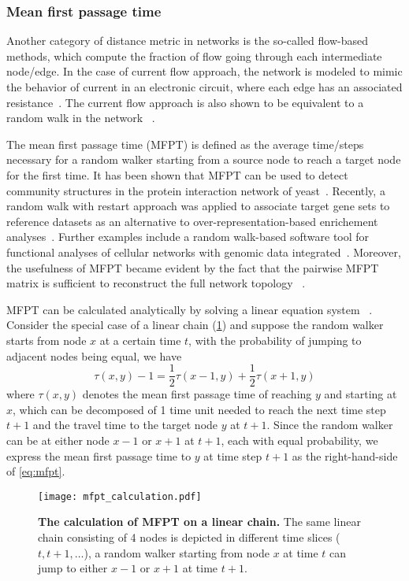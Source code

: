 \subsubsection{Mean first passage time}
Another category of distance metric in networks is the 
so-called flow-based methods, which compute the fraction of flow going through each intermediate node/edge. In the case of current flow approach, the network is modeled to mimic the behavior of current in an electronic circuit, where each edge has an associated resistance~\citep{Missiuro2009}. The current flow approach is
also shown to be equivalent to a random walk in the network~%
\citep{Doyle2000}.

The mean first passage time (MFPT) is defined as the average time/steps 
necessary for 
a random walker starting from a source node to reach a target node for the
first time. It has been shown that MFPT can be used to detect community
structures in the protein interaction network of yeast~\citep{Zhou2003}. 
Recently, a random walk with restart approach was applied to associate
target gene sets to reference datasets as an alternative to 
over-representation-based enrichement analyses~\citep{Glaab2012}. 
Further examples include a random walk-based software tool for functional
analyses of cellular networks with genomic data integrated~\citep{Komurov2012a}.
Moreover,
the usefulness of MFPT became evident by the fact that the pairwise MFPT 
matrix is sufficient to reconstruct the full network topology~%
\citep{Wittmann2009}.

MFPT can be calculated analytically by solving a linear equation system~%
\citep{Kampen2007}. Consider the special case of a linear chain 
(\ref{fig:mfpt_calculation}) and suppose the random walker starts from node 
$x$ at a certain time $t$, with the probability of jumping to adjacent nodes
being equal, we have
\begin{equation}
\tau(x,y) - 1 = \frac{1}{2}\tau(x-1,y) + \frac{1}{2}\tau(x+1,y)
\label{eq:mfpt}
\end{equation}
where $\tau(x,y)$ denotes the mean first passage time of reaching $y$ and 
starting at $x$, which can be decomposed of 1 time unit needed to reach the
next time step $t+1$ and the travel time to the target node $y$ at $t+1$.
Since the random walker can be at either node $x-1$ or $x+1$ at $t+1$, each
with equal probability, we express the mean first passage time to $y$ at
time step $t+1$ as the right-hand-side of \ref{eq:mfpt}.

\begin{figure}[!ht]
\begin{center}
\texttt{[image: mfpt\_calculation.pdf]}
\end{center}
\caption[MFPT calculation]{
{\bf The calculation of MFPT on a linear chain.}
The same linear chain consisting of 4 nodes is depicted in different time 
slices ($t,t+1,\ldots$), 
a random walker starting from node $x$ at time $t$ can jump to either $x-1$ 
or $x+1$ at time $t+1$.
}
\label{fig:mfpt_calculation}
\end{figure}

